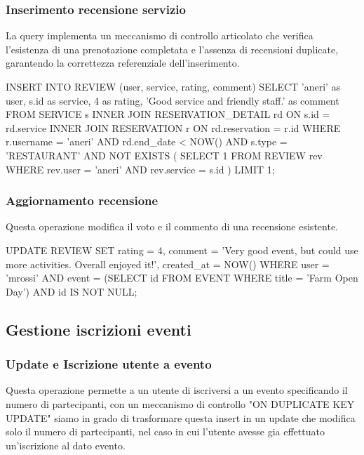 \documentclass[a4paper,12pt]{report}
\begin{document}
\subsubsection{Inserimento recensione servizio} 
La query implementa un meccanismo di controllo articolato che verifica l'esistenza di una prenotazione completata e l'assenza di recensioni duplicate, garantendo la correttezza referenziale dell'inserimento.

\begin{sqlcode}[caption={Query per inserimento recensione servizio}]
INSERT INTO REVIEW (user, service, rating, comment) 
SELECT 'aneri' as user, s.id as service, 4 as rating, 
       'Good service and friendly staff.' as comment 
FROM SERVICE s 
INNER JOIN RESERVATION_DETAIL rd ON s.id = rd.service 
INNER JOIN RESERVATION r ON rd.reservation = r.id 
WHERE r.username = 'aneri' 
  AND rd.end_date < NOW() 
  AND s.type = 'RESTAURANT' 
  AND NOT EXISTS (
    SELECT 1 
    FROM REVIEW rev 
    WHERE rev.user = 'aneri' AND rev.service = s.id
  ) 
LIMIT 1;
\end{sqlcode}

\subsubsection{Aggiornamento recensione} 
Questa operazione modifica il voto e il commento di una recensione esistente.

\begin{sqlcode}[caption={Query per aggiornamento recensione}]
UPDATE REVIEW 
SET rating = 4, 
    comment = 'Very good event, but could use more activities. Overall enjoyed it!',
    created_at = NOW() 
WHERE user = 'mrossi' 
  AND event = (SELECT id FROM EVENT WHERE title = 'Farm Open Day') 
  AND id IS NOT NULL;
\end{sqlcode}

\subsection{Gestione iscrizioni eventi} 

\subsubsection{Update e Iscrizione utente a evento} 
Questa operazione permette a un utente di iscriversi a un evento specificando il numero di partecipanti, con un meccanismo di controllo "ON DUPLICATE KEY UPDATE" siamo in grado di trasformare questa insert in un update che modifica solo il numero di partecipanti, nel caso in cui l'utente avesse gia effettuato un'iscrizione al dato evento.
\end{document}
